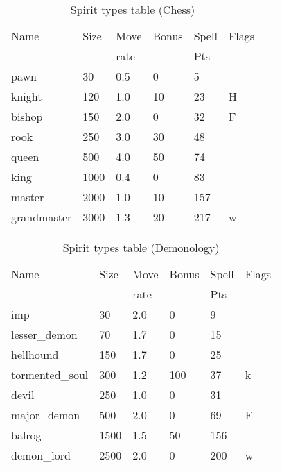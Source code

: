 \begin{same}
\begin{table}[hbpt]
\caption{Spirit types table (Chess)}
\begin{tabular}{ || l | l | l | l | l | l || }
\hline
Name            & Size &Move&Bonus&Spell&Flags\\
                &      &rate&     &Pts  &\\
\hline
pawn            &   30 & 0.5&   0 &   5 &\\
knight          &  120 & 1.0&  10 &  23 &H\\
bishop          &  150 & 2.0&   0 &  32 &F\\
rook            &  250 & 3.0&  30 &  48 &\\
queen           &  500 & 4.0&  50 &  74 &\\
king            & 1000 & 0.4&   0 &  83 &\\
master          & 2000 & 1.0&  10 &  157 &\\
grandmaster     & 3000 & 1.3&  20 &  217 &w\\
\hline
\end{tabular}
\end{table}
\end{same}
\begin{same}
\begin{table}[hbpt]
\caption{Spirit types table (Demonology)}
\begin{tabular}{ || l | l | l | l | l | l || }
\hline
Name            & Size &Move&Bonus&Spell&Flags\\
                &      &rate&     &Pts  &\\
\hline
imp             &   30 & 2.0&   0 &   9 &\\
lesser_demon    &   70 & 1.7&   0 &  15 &\\
hellhound       &  150 & 1.7&   0 &  25 &\\
tormented_soul  &  300 & 1.2& 100 &  37 &k\\
devil           &  250 & 1.0&   0 &  31 &\\
major_demon     &  500 & 2.0&   0 &  69 &F\\
balrog          & 1500 & 1.5&  50 &  156 &\\
demon_lord      & 2500 & 2.0&   0 &  200 &w\\
\hline
\end{tabular}
\end{table}
\end{same}
